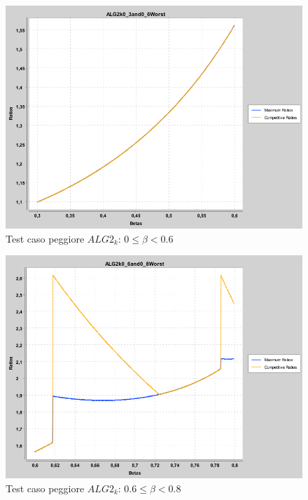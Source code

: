 \documentclass[12pt]{article}
\begin{document}
\begin{figure}[H]
\caption{Test caso peggiore $ALG2_{k}$: $0 \leq \beta < 0.6$}
\centering
\includegraphics[scale=0.4]{max/ALG2k0_3and0_6Worst.png}
\end{figure}
\begin{figure}[H]
\caption{Test caso peggiore $ALG2_{k}$: $0.6 \leq \beta < 0.8$}
\centering
\includegraphics[scale=0.4]{max/ALG2k0_6and0_8Worst.png}
\end{figure}
\end{document}
